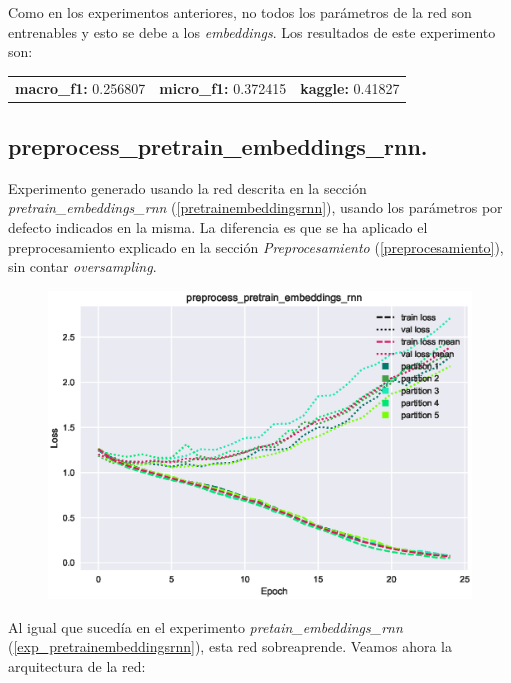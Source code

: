 \documentclass[11pt]{article}
\begin{document}
Como en los experimentos anteriores, no todos los parámetros de la red son entrenables y esto se debe a los \textit{embeddings}. Los resultados de este experimento son: 

\begin{table}[H]
\begin{tabular}{c|c|c}
\textbf{macro\_f1:} 0.256807 & \textbf{micro\_f1:} 0.372415 & \textbf{kaggle:} 0.41827
\end{tabular}
\end{table}

\subsection{preprocess\_pretrain\_embeddings\_rnn.} \label{exp_preprocesspretrainembeddingsrnn}

Experimento generado usando la red descrita en la sección \textit{pretrain\_embeddings\_rnn} (\ref{pretrainembeddingsrnn}), usando los parámetros por defecto indicados en la misma. La diferencia es que se ha aplicado el preprocesamiento explicado en la sección \textit{Preprocesamiento} (\ref{preprocesamiento}), sin contar \textit{oversampling}.

\begin{figure}[H]
\includegraphics[width=\linewidth]{images/loss/preprocess_pretrain_embeddings_rnn-1554207097.eps}
\end{figure}

Al igual que sucedía en el experimento \textit{pretain\_embeddings\_rnn} (\ref{exp_pretrainembeddingsrnn}), esta red sobreaprende. Veamos ahora la arquitectura de la red:
\end{document}
